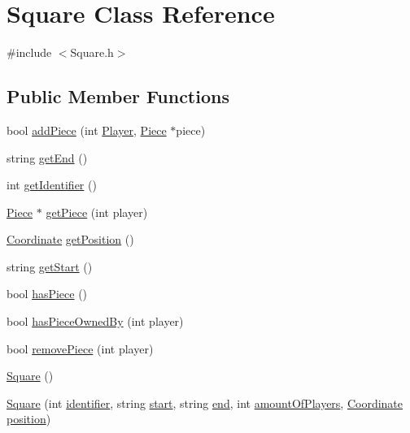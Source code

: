 \hypertarget{classSquare}{\section{Square Class Reference}
\label{classSquare}
}


{\ttfamily \#include $<$Square.\-h$>$}

\subsection*{Public Member Functions}
\begin{DoxyCompactItemize}
\item 
bool \hyperlink{classSquare_a8839d897e85342bc9ccd0c3c8ae37ac1}{add\-Piece} (int \hyperlink{classPlayer}{Player}, \hyperlink{classPiece}{Piece} $\ast$piece)
\item 
string \hyperlink{classSquare_aa2d3fa7c91fef0ab75b657fff84a0e5d}{get\-End} ()
\item 
int \hyperlink{classSquare_a61e01113ed501094f077facc98247834}{get\-Identifier} ()
\item 
\hyperlink{classPiece}{Piece} $\ast$ \hyperlink{classSquare_ae679e5dba819d52e03d96e4d6b192aba}{get\-Piece} (int player)
\item 
\hyperlink{structCoordinate}{Coordinate} \hyperlink{classSquare_a49a097184b5773dbdac054aba5eaf556}{get\-Position} ()
\item 
string \hyperlink{classSquare_a950cc5ee3db1236f953b2b54a7eb2aad}{get\-Start} ()
\item 
bool \hyperlink{classSquare_a875e971657b4670b121837d80f247626}{has\-Piece} ()
\item 
bool \hyperlink{classSquare_a767fa41efec1594d87ae7b47854ea8f1}{has\-Piece\-Owned\-By} (int player)
\item 
bool \hyperlink{classSquare_aa549b2d293165c7978b21f7d26f58fb2}{remove\-Piece} (int player)
\item 
\hyperlink{classSquare_a3dc7ff9aefc2725172b5d3153973d243}{Square} ()
\item 
\hyperlink{classSquare_ae66f3039b28e813bcdc832bbe1f5ddcf}{Square} (int \hyperlink{classSquare_a564b1f548b3be90a32c0dfd045de1187}{identifier}, string \hyperlink{classSquare_ab8661c5b8e8026d074cf11c9e6634d18}{start}, string \hyperlink{classSquare_a419b11e7d6cac76bfbc89c9b1ad111f2}{end}, int \hyperlink{classSquare_ae6bded80423341335f9dd86c189955c0}{amount\-Of\-Players}, \hyperlink{structCoordinate}{Coordinate} \hyperlink{classSquare_a08e99afd7be993cd1cbb50f4716e95ff}{position})
\end{DoxyCompactItemize}
